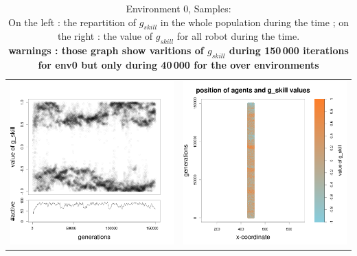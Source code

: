 \documentclass[a4paper,10pt]{article}
\begin{document}
\begin{table}[h!]
\caption{Environment 0, Samples:\\On the left : the repartition of $g_{skill}$ in the whole population during the time ; on the right : the value of $g_{skill}$ for all robot during the time.\\ {\scriptsize \textbf{warnings : those graph show varitions of $g_{skill}$ during 150\,000 iterations for env0 but only during 40\,000 for the over environments} }}
\centering
\begin{tabular}{cc}
\includegraphics[width=\imgSize]{images/5StaticEnv/Gplot59_staticEnv0}&\includegraphics[width=\imgSize]{images/5StaticEnv/Gplot59Static_staticEnv0}\\

\end{tabular}
\end{table}
\end{document}
